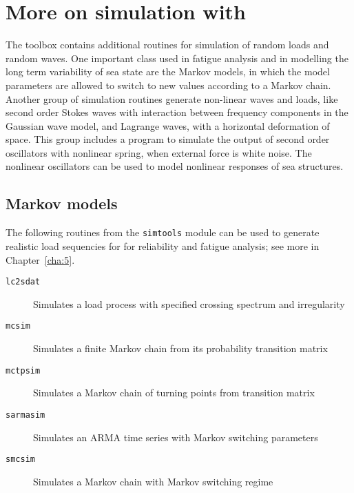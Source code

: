 
\section{More on simulation  with \wf{}}\label{s:2.4}
The \wf{} toolbox contains additional routines for simulation of 
random loads and random waves. 
One important class used in fatigue analysis and in modelling
the long term variability of sea state are the Markov models, 
in which the model parameters are allowed to switch to new 
values according to a Markov chain.
Another group of simulation routines generate non-linear waves and loads, 
like second order Stokes waves with interaction between 
frequency components in the Gaussian wave model, and 
Lagrange waves, with a horizontal deformation of  space. 
This  group includes a program to simulate the output of second
order oscillators with nonlinear spring,  when external force is
white noise. The nonlinear oscillators can be used to
model nonlinear responses of sea structures.

\subsection{Markov models}
The following routines from the {\tt simtools} module can be used to generate realistic 
load sequencies  for for reliability and fatigue analysis; see more in Chapter~\ref{cha:5}.
\begin{description}
\item[{\tt lc2sdat}] Simulates a load process with specified crossing spectrum and irregularity
\item[{\tt mcsim}] Simulates a finite Markov chain from its probability transition matrix
\item[{\tt mctpsim}] Simulates a Markov chain of turning points from transition matrix
\item[{\tt sarmasim}] Simulates an ARMA time series with Markov switching parameters
\item[{\tt smcsim}] Simulates a Markov chain with Markov switching regime
\end{description}

